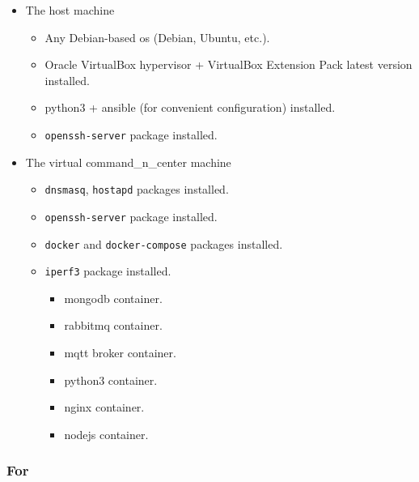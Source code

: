 \begin{itemize}
\tightlist
\item
  The host machine

\begin{itemize}
	\tightlist
	\item
	Any Debian-based \acrshort{os} (Debian, Ubuntu, etc.).
	\item
	Oracle VirtualBox hypervisor + VirtualBox Extension Pack latest version installed.
	\item
	\gls{python3} + \gls{ansible} (for convenient configuration) installed.
	\item
	\texttt{openssh-server} package installed.
\end{itemize}
\item
  The virtual \gls{command_n_center} machine

  \begin{itemize}
  \tightlist
  \item
    \texttt{dnsmasq}, \texttt{hostapd} packages installed.
  \item
    \texttt{openssh-server} package installed.
  \item
    \texttt{docker} and \texttt{docker-compose} packages installed.
  \item
  	\texttt{iperf3} package installed.

    \begin{itemize}
    \tightlist
    \item
      \gls{mongodb} container.
    \item
      \gls{rabbitmq} container.
    \item
      \gls{mqtt} broker container.
    \item
      \gls{python3} container.
    \item
      \gls{nginx} container.
    \item
      \gls{nodejs} container.
    \end{itemize}
  \end{itemize}
\end{itemize}

\subsubsection{For }\label{for-aps}

